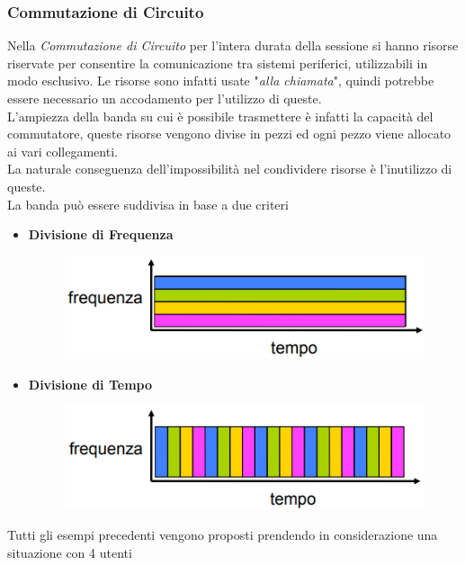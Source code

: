 \documentclass{article}
\begin{document}
            \subsubsection{Commutazione di Circuito}
                Nella \textit{Commutazione di Circuito} per l'intera durata della sessione si hanno risorse riservate per consentire la comunicazione tra sistemi periferici, utilizzabili in modo esclusivo. Le risorse sono infatti usate "\textit{alla chiamata}", quindi potrebbe essere necessario un accodamento per l'utilizzo di queste.\\
                L'ampiezza della banda su cui è possibile trasmettere è infatti la capacità del commutatore, queste risorse vengono divise in pezzi ed ogni pezzo viene allocato ai vari collegamenti.\\ 
                La naturale conseguenza dell'impossibilità nel condividere risorse è l'inutilizzo di queste.\\
                La banda può essere suddivisa in base a due criteri
                \begin{itemize}
                    \item \textbf{Divisione di Frequenza}
                          \begin{figure}[H]
                              \centering
                              \includegraphics[width=\textwidth]{pic/fdm.png}
                              \label{Divisione di Frequenza}
                          \end{figure}
                    \item \textbf{Divisione di Tempo}
                          \begin{figure}[H]
                              \centering
                              \includegraphics[width=\textwidth]{pic/tdm.png}
                              \label{Divisione di Tempo}
                          \end{figure}
                \end{itemize}
                Tutti gli esempi precedenti vengono proposti prendendo in considerazione una situazione con 4 utenti 
\end{document}
